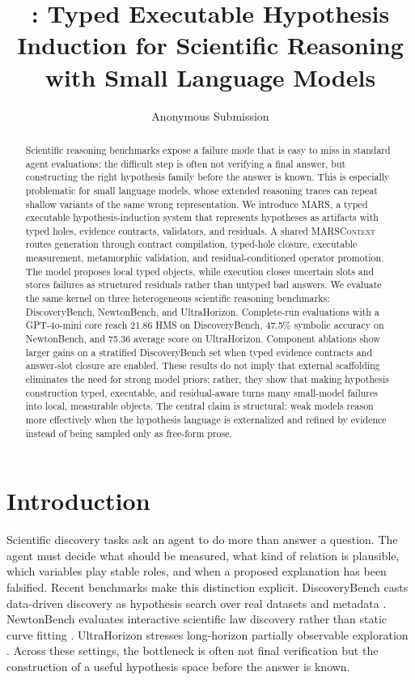 \documentclass[letterpaper]{article}
\title{\mars: Typed Executable Hypothesis Induction for Scientific Reasoning with Small Language Models}
\author{Anonymous Submission}
\newcommand{\mars}{\textsc{MARS}\xspace}
\newcommand{\gptmini}{GPT-4o-mini\xspace}
\begin{document}
\maketitle

\begin{abstract}
Scientific reasoning benchmarks expose a failure mode that is easy to miss in
standard agent evaluations: the difficult step is often not verifying a final
answer, but constructing the right hypothesis family before the answer is
known. This is especially problematic for small language models, whose extended
reasoning traces can repeat shallow variants of the same wrong representation.
We introduce \mars, a typed executable hypothesis-induction system that
represents hypotheses as artifacts with typed holes, evidence contracts,
validators, and residuals. A shared \textsc{MARSContext} routes generation
through contract compilation, typed-hole closure, executable measurement,
metamorphic validation, and residual-conditioned operator promotion. The model
proposes local typed objects, while execution closes uncertain slots and stores
failures as structured residuals rather than untyped bad answers. We evaluate
the same kernel on three heterogeneous scientific reasoning benchmarks:
DiscoveryBench, NewtonBench, and UltraHorizon. Complete-run evaluations with a
\gptmini core reach 21.86 HMS on DiscoveryBench, 47.5\% symbolic accuracy on
NewtonBench, and 75.36 average score on UltraHorizon. Component ablations show
larger gains on a stratified DiscoveryBench set when typed evidence contracts
and answer-slot closure are enabled. These results do not imply that external
scaffolding eliminates the need for strong model priors; rather, they show that
making hypothesis construction typed, executable, and residual-aware turns many
small-model failures into local, measurable objects. The central claim is
structural: weak models reason more effectively when the hypothesis language is
externalized and refined by evidence instead of being sampled only as free-form
prose.
\end{abstract}

\section{Introduction}

Scientific discovery tasks ask an agent to do more than answer a question. The
agent must decide what should be measured, what kind of relation is plausible,
which variables play stable roles, and when a proposed explanation has been
falsified. Recent benchmarks make this distinction explicit. DiscoveryBench
casts data-driven discovery as hypothesis search over real datasets and
metadata \citep{discoverybench}. NewtonBench evaluates interactive scientific
law discovery rather than static curve fitting \citep{newtonbench}.
UltraHorizon stresses long-horizon partially observable exploration
\citep{ultrahorizon}. Across these settings, the bottleneck is often not final
verification but the construction of a useful hypothesis space before the
answer is known.
\end{document}
